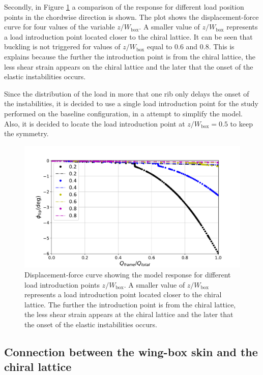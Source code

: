     Secondly, in Figure \ref{fig:forceDisplacement-loadZ0coma8} a comparison of the response for different load position points in the chordwise direction is shown. The plot shows the displacement-force curve for four values of the variable $z/W_{\mathrm{box}}$. A smaller value of $z/W_{\mathrm{box}}$ represents a load introduction point located closer to the chiral lattice. It can be seen that buckling is not triggered for values of $z/W_{\mathrm{box}}$ equal to 0.6 and 0.8. This is explains because the further the introduction point is from the chiral lattice, the less shear strain appears on the chiral lattice and the later that the onset of the elastic instabilities occurs. 

    Since the distribution of the load in more that one rib only delays the onset of the instabilities, it is decided to use a single load introduction point for the study performed on the baseline configuration, in a attempt to simplify the model. Also, it is decided to locate the load introduction point at $z/W_{\mathrm{box}} = 0.5$ to keep the symmetry.

    \begin{figure}[!htpb]
      \centering
      \includegraphics[width=0.8 \textwidth]{figures/result-model/forceDisplacement-loadZ0coma8}
      \caption[Displacement-force curve showing the model response for different load introduction points $z/W_{\mathrm{box}}$]{Displacement-force curve showing the model response for different load introduction points $z/W_{\mathrm{box}}$. A smaller value of $z/W_{\mathrm{box}}$ represents a load introduction point located closer to the chiral lattice. The further the introduction point is from the chiral lattice, the less shear strain appears at the chiral lattice and the later that the onset of the elastic instabilities occurs.}
      \label{fig:forceDisplacement-loadZ0coma8}
    \end{figure}

  \clearpage
  \subsection{Connection between the wing-box skin and the chiral lattice} \label{subsec:connection_results_model} %

